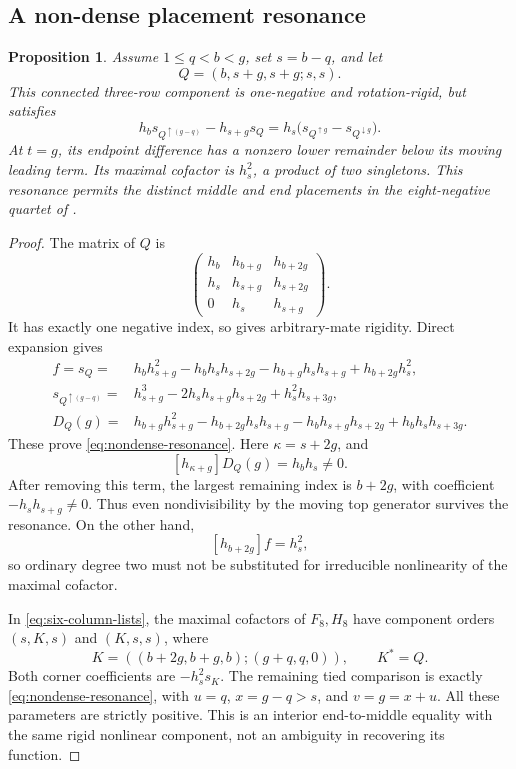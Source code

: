 \documentclass[11pt,a4paper]{amsart}
\numberwithin{equation}{section}
\theoremstyle{plain}
\newtheorem{proposition}[theorem]{Proposition}
\theoremstyle{definition}
\begin{document}
\subsection{A non-dense placement resonance}

\begin{proposition}\label{prop:nondense-resonance}
Assume \(1\le q<b<g\), set \(s=b-q\), and let
\[
 Q=(b,s+g,s+g;s,s).
\]
This connected three-row component is one-negative and rotation-rigid, but satisfies
\begin{equation}\label{eq:nondense-resonance}
 h_b s_{Q^{\uparrow(g-q)}}-h_{s+g}s_Q
 =h_s\bigl(s_{Q^{\uparrow g}}-s_{Q^{\downarrow g}}\bigr).
\end{equation}
At \(t=g\), its endpoint difference has a nonzero lower remainder below its moving leading term.  Its maximal cofactor is \(h_s^2\), a product of two singletons.  This resonance permits the distinct middle and end placements in the eight-negative quartet of .
\end{proposition}

\begin{proof}
The matrix of \(Q\) is
\[
 \begin{pmatrix}
 h_b&h_{b+g}&h_{b+2g}\\
 h_s&h_{s+g}&h_{s+2g}\\
 0&h_s&h_{s+g}
 \end{pmatrix}.
\]
It has exactly one negative index, so  gives arbitrary-mate rigidity.  Direct expansion gives
\begin{align*}
 f=s_Q={}&h_bh_{s+g}^2-h_bh_sh_{s+2g}
           -h_{b+g}h_sh_{s+g}+h_{b+2g}h_s^2,\\
 s_{Q^{\uparrow(g-q)}}={}&h_{s+g}^3-2h_sh_{s+g}h_{s+2g}
                           +h_s^2h_{s+3g},\\
  D_Q(g)={}&h_{b+g}h_{s+g}^2-h_{b+2g}h_sh_{s+g}
                -h_bh_{s+g}h_{s+2g}+h_bh_sh_{s+3g}.
\end{align*}
These prove \eqref{eq:nondense-resonance}.  Here \(\kappa=s+2g\), and
\[
 [h_{\kappa+g}] D_Q(g)=h_bh_s\ne0.
\]
After removing this term, the largest remaining index is \(b+2g\), with coefficient \(-h_sh_{s+g}\ne0\).  Thus even nondivisibility by the moving top generator survives the resonance.  On the other hand,
\[
 [h_{b+2g}]f=h_s^2,
\]
so ordinary degree two must not be substituted for irreducible nonlinearity of the maximal cofactor.

In \eqref{eq:six-column-lists}, the maximal cofactors of \(F_8,H_8\) have component orders \((s,K,s)\) and \((K,s,s)\), where
\[
 K=((b+2g,b+g,b);(g+q,q,0)),\qquad K^*=Q.
\]
Both corner coefficients are \(-h_s^2s_K\).  The remaining tied comparison is exactly \eqref{eq:nondense-resonance}, with \(u=q\), \(x=g-q>s\), and \(v=g=x+u\).  All these parameters are strictly positive.  This is an interior end-to-middle equality with the same rigid nonlinear component, not an ambiguity in recovering its function.
\end{proof}
\end{document}
